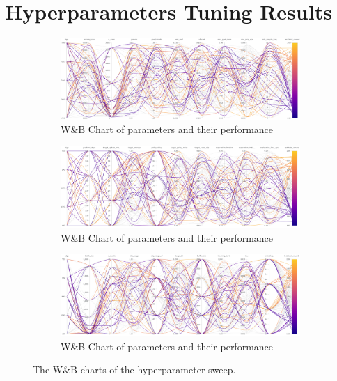 \documentclass[../xlapes02]{subfiles}
\begin{document}
    \section{Hyperparameters Tuning Results}\label{sec:hyperparameters-tuning-results}
    \begin{figure}
        \begin{subfigure}[t]{\textwidth}
            \centering
            \includegraphics[width=\linewidth]{image/wandb/wb1}
            \caption{W\&B Chart of parameters and their performance}
            \label{fig:wb-chart1}
        \end{subfigure}

        \vspace{0.5cm}

        \begin{subfigure}[t]{\textwidth}
            \centering
            \includegraphics[width=\linewidth]{image/wandb/wb2}
            \caption{W\&B Chart of parameters and their performance}
            \label{fig:wb-chart2}
        \end{subfigure}

        \vspace{0.5cm}

        \begin{subfigure}[t]{\textwidth}
            \centering
            \includegraphics[width=\linewidth]{image/wandb/wb3}
            \caption{W\&B Chart of parameters and their performance}
            \label{fig:wb-chart3}
        \end{subfigure}

        \caption{The W\&B charts of the hyperparameter sweep.}
        \label{fig:wb-charts}
    \end{figure}
\end{document}
